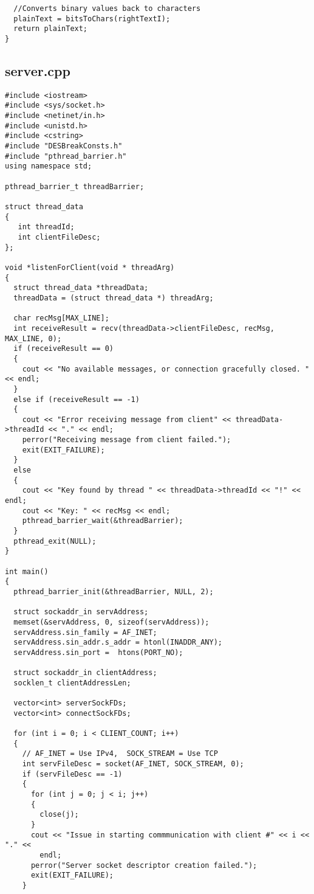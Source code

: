 \documentclass[11pt]{article}
\begin{document}
\begin{verbatim}
  //Converts binary values back to characters
  plainText = bitsToChars(rightTextI);
  return plainText;
}

\end{verbatim}

\subsection{server.cpp}
\begin{verbatim}
#include <iostream>
#include <sys/socket.h>
#include <netinet/in.h>
#include <unistd.h>
#include <cstring>
#include "DESBreakConsts.h"
#include "pthread_barrier.h"
using namespace std;

pthread_barrier_t threadBarrier;

struct thread_data
{
   int threadId;
   int clientFileDesc;
};

void *listenForClient(void * threadArg)
{
  struct thread_data *threadData;
  threadData = (struct thread_data *) threadArg;

  char recMsg[MAX_LINE];
  int receiveResult = recv(threadData->clientFileDesc, recMsg, MAX_LINE, 0);
  if (receiveResult == 0)
  {
    cout << "No available messages, or connection gracefully closed. " << endl;
  }
  else if (receiveResult == -1)
  {
    cout << "Error receiving message from client" << threadData->threadId << "." << endl;
    perror("Receiving message from client failed.");
    exit(EXIT_FAILURE);
  }
  else
  {
    cout << "Key found by thread " << threadData->threadId << "!" << endl;
    cout << "Key: " << recMsg << endl;
    pthread_barrier_wait(&threadBarrier);
  }
  pthread_exit(NULL);
}

int main()
{
  pthread_barrier_init(&threadBarrier, NULL, 2);

  struct sockaddr_in servAddress;
  memset(&servAddress, 0, sizeof(servAddress));
  servAddress.sin_family = AF_INET;
  servAddress.sin_addr.s_addr = htonl(INADDR_ANY);
  servAddress.sin_port =  htons(PORT_NO);

  struct sockaddr_in clientAddress;
  socklen_t clientAddressLen;

  vector<int> serverSockFDs;
  vector<int> connectSockFDs;

  for (int i = 0; i < CLIENT_COUNT; i++)
  {
    // AF_INET = Use IPv4,  SOCK_STREAM = Use TCP
    int servFileDesc = socket(AF_INET, SOCK_STREAM, 0);
    if (servFileDesc == -1)
    {
      for (int j = 0; j < i; j++)
      {
        close(j);
      }
      cout << "Issue in starting commmunication with client #" << i << "." <<
        endl;
      perror("Server socket descriptor creation failed.");
      exit(EXIT_FAILURE);
    }


\end{verbatim}
\end{document}
